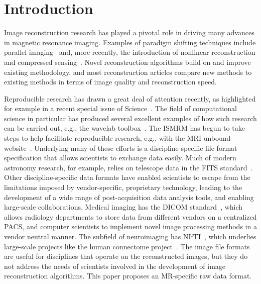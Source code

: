 \documentclass[12pt, draft]{article}
\begin{document}
\newpage
\clearpage
\onecolumn

\section*{Introduction}
Image reconstruction research has played a pivotal role in driving many advances in magnetic resonance imaging. Examples of paradigm shifting techniques include parallel imaging~\cite{Pruessmann:1999uq, Sodickson:1997fk, Griswold:2002kx}  and, more recently, the introduction of nonlinear reconstruction and compressed sensing~\cite{Donoho:2006compressed, Lustig:2007vn}. Novel reconstruction algorithms build on and improve existing methodology, and most reconstruction articles compare new methods to existing methods in terms of image quality and reconstruction speed.

Reproducible research has drawn a great deal of attention recently, as highlighted for example in a recent special issue of Science~\cite{Jasny:2011again, Peng:2011reproducible}. The field of computational science in particular has produced several excellent examples of how such research can be carried out, e.g., the wavelab toolbox~\cite{wavelab}.  The ISMRM has begun to take steps to help facilitate reproducible research, e.g., with the MRI unbound website~\cite{mri_unbound}. Underlying many of these efforts is a discipline-specific file format specification that allows scientists to exchange data easily.  Much of modern astronomy research, for example, relies on telescope data in the FITS standard~\cite{fits}.  Other discipline-specific data formats have enabled scientists to escape from the limitations imposed by vendor-specific, proprietary technology, leading to the development of a wide range of post-acquisition data analysis tools, and enabling large-scale collaborations.  Medical imaging has the DICOM standard~\cite{dicom}, which allows radiology departments to store data from different vendors on a centralized PACS, and computer scientists to implement novel image processing methods in a vendor neutral manner. The subfield of neuroimaging has NIfTI~\cite{nifti}, which underlies large-scale projects like the human connectome project~\cite{connectome}. The image file formats are useful for disciplines that operate on the reconstructed images, but they do not address the needs of scientists involved in the development of image reconstruction algorithms. This paper proposes an MR-specific raw data format. 
\end{document}
